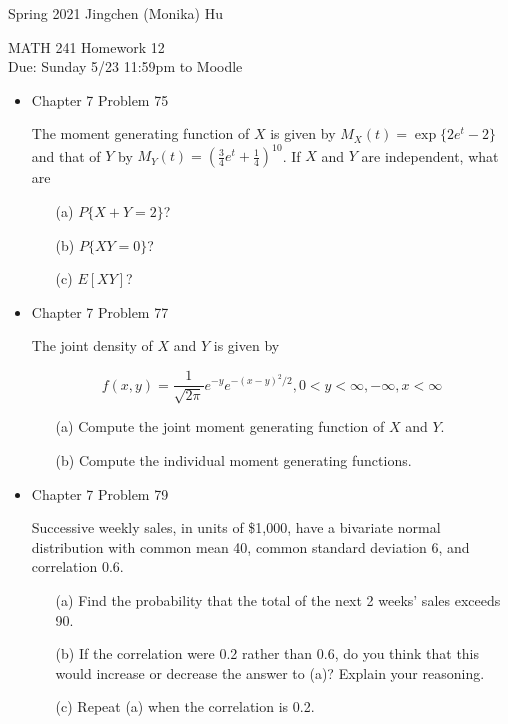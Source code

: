 \documentclass[11pt]{article}
\begin{document}
\enlargethispage{\baselineskip}

Spring 2021 \hfill Jingchen (Monika) Hu\\

\begin{center}
{\huge MATH 241 Homework 12}	\\
Due: Sunday 5/23 11:59pm to Moodle
\end{center}
\vspace{0.5cm}

\begin{itemize}


    \item
    Chapter 7 Problem 75
    
    The moment generating function of $X$ is given by $M_X(t) = \exp\{2e^t - 2\}$ and that of $Y$ by $M_Y(t) = (\frac{3}{4}e^t + \frac{1}{4})^{10}$. If $X$ and $Y$ are independent, what are
    
    \begin{itemize}
    \item[(a)] $P\{X + Y = 2\}$?
    \item[(b)] $P\{XY = 0\}$?
    \item[(c)] $E[XY]$?
    \end{itemize}

    \item
    Chapter 7 Problem 77
    
    The joint density of $X$ and $Y$ is given by 
    
    $$
    f(x, y) = \frac{1}{\sqrt{2\pi}} e^{-y} e^{-(x-y)^2/2}, 0 < y < \infty, -\infty, x < \infty
    $$
    
    \begin{itemize}
    \item[(a)] Compute the joint moment generating function of $X$ and $Y$.
    \item[(b)] Compute the individual moment generating functions.
    \end{itemize}

    \item
    Chapter 7 Problem 79
    
    Successive weekly sales, in units of \$1,000, have a bivariate normal distribution with common mean 40, common standard deviation 6, and correlation 0.6.
    
    \begin{itemize}
    \item[(a)] Find the probability that the total of the next 2 weeks' sales exceeds 90.
    \item[(b)] If the correlation were 0.2 rather than 0.6, do you think that this would increase or decrease the answer to (a)? Explain your reasoning.
    \item[(c)] Repeat (a) when the correlation is 0.2.
    \end{itemize}


\end{itemize}
\end{document}
